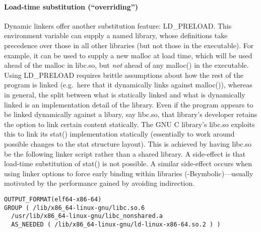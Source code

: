 \paragraph{Load-time substitution (``overriding'')}
Dynamic linkers offer another substitution feature: \textsf{LD\_PRELOAD}. 
This environment variable can supply a named library, 
whose definitions take precedence over those in all other
libraries (but not those in the executable). 
For example, it can be used to supply a new \textsf{malloc} at load time, which will be used ahead of the \textsf{malloc} in \textsf{libc.so}, but \emph{not} ahead of any \textsf{malloc()} in the executable.
Using \textsf{LD\_PRELOAD} requires brittle assumptions about how the rest of the program is linked (e.g.\ here that it dynamically links against \textsf{malloc()}), whereas 
in general, the split between what is statically linked and what is dynamically linked is an implementation detail of the library. 
Even if the program appears to be linked dynamically against a libary, say \textsf{libc.so}, that library's developer retains the option to link certain content statically.
The GNU C library's \textsf{libc.so} exploits this to link its \textsf{stat()} implementation statically (essentially to work around possible changes to the \textsf{stat} structure layout).
This is achieved by having \textsf{libc.so} be the following linker script rather than a shared library.
A side-effect is that load-time substitution of \textsf{stat()} is not possible.
A similar side-effect occurs when using linker options to force early binding within libraries (\textsf{-Bsymbolic})---usually motivated by the performance gained by avoiding indirection. 

{\scriptsize\begin{lstlisting}[language=plain,basicstyle=\sffamily,columns=flexible]
OUTPUT_FORMAT(elf64-x86-64)
GROUP ( /lib/x86_64-linux-gnu/libc.so.6 
  /usr/lib/x86_64-linux-gnu/libc_nonshared.a
  AS_NEEDED ( /lib/x86_64-linux-gnu/ld-linux-x86-64.so.2 ) )
\end{lstlisting}}


